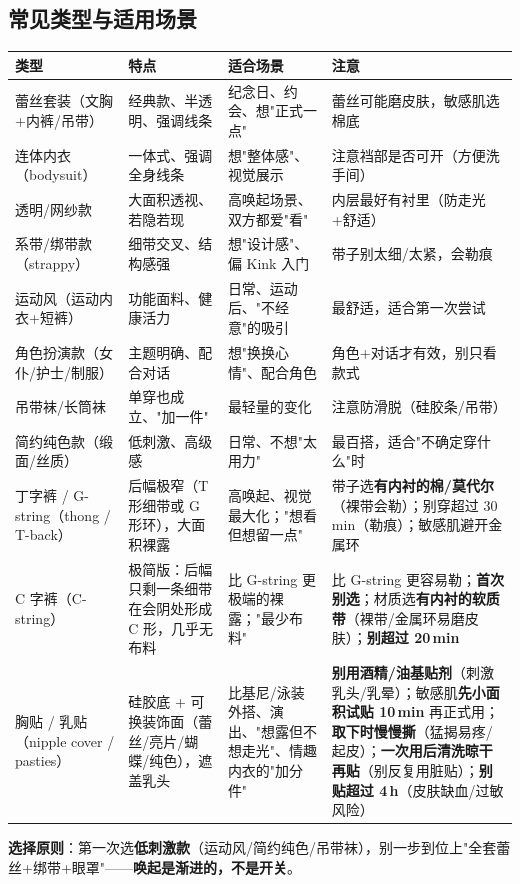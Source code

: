 \documentclass[12pt,UTF8,openany]{ctexbook}
\begin{document}
\subsection*{常见类型与适用场景}
\begin{tabularx}{\textwidth}{X X X X}
\toprule
\textbf{类型} & \textbf{特点} & \textbf{适合场景} & \textbf{注意} \\
\midrule
蕾丝套装（文胸+内裤/吊带） & 经典款、半透明、强调线条 & 纪念日、约会、想"正式一点" & 蕾丝可能磨皮肤，敏感肌选棉底 \\
连体内衣（bodysuit） & 一体式、强调全身线条 & 想"整体感"、视觉展示 & 注意裆部是否可开（方便洗手间） \\
透明/网纱款 & 大面积透视、若隐若现 & 高唤起场景、双方都爱"看" & 内层最好有衬里（防走光+舒适） \\
系带/绑带款（strappy） & 细带交叉、结构感强 & 想"设计感"、偏 Kink 入门 & 带子别太细/太紧，会勒痕 \\
运动风（运动内衣+短裤） & 功能面料、健康活力 & 日常、运动后、"不经意"的吸引 & 最舒适，适合第一次尝试 \\
角色扮演款（女仆/护士/制服） & 主题明确、配合对话 & 想"换换心情"、配合角色 & 角色+对话才有效，别只看款式 \\
吊带袜/长筒袜 & 单穿也成立、"加一件" & 最轻量的变化 & 注意防滑脱（硅胶条/吊带） \\
简约纯色款（缎面/丝质） & 低刺激、高级感 & 日常、不想"太用力" & 最百搭，适合"不确定穿什么"时 \\
丁字裤 / G-string（thong / T-back） & 后幅极窄（T 形细带或 G 形环），大面积裸露 & 高唤起、视觉最大化；"想看但想留一点" & 带子选\textbf{有内衬的棉/莫代尔}（裸带会勒）；别穿超过 30\,min（勒痕）；敏感肌避开金属环 \\
C 字裤（C-string） & 极简版：后幅只剩一条细带在会阴处形成 C 形，几乎无布料 & 比 G-string 更极端的裸露；"最少布料" & 比 G-string 更容易勒；\textbf{首次别选}；材质选\textbf{有内衬的软质带}（裸带/金属环易磨皮肤）；\textbf{别超过 20\,min} \\
胸贴 / 乳贴（nipple cover / pasties） & 硅胶底 + 可换装饰面（蕾丝/亮片/蝴蝶/纯色），遮盖乳头 & 比基尼/泳装外搭、演出、"想露但不想走光"、情趣内衣的"加分件" & \textbf{别用酒精/油基贴剂}（刺激乳头/乳晕）；敏感肌\textbf{先小面积试贴 10\,min} 再正式用；\textbf{取下时慢慢撕}（猛揭易疼/起皮）；\textbf{一次用后清洗晾干再贴}（别反复用脏贴）；\textbf{别贴超过 4\,h}（皮肤缺血/过敏风险） \\
\bottomrule
\end{tabularx}
\par\smallskip
\textbf{选择原则}：第一次选\textbf{低刺激款}（运动风/简约纯色/吊带袜），别一步到位上"全套蕾丝+绑带+眼罩"——\textbf{唤起是渐进的，不是开关}。
\end{document}
